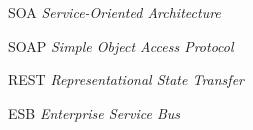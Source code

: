 \begin{siglas}
  \item[SOA] \textit{Service-Oriented Architecture}
  \item[SOAP] \textit{Simple Object Access Protocol}
  \item[REST] \textit{Representational State Transfer}
  \item[ESB] \textit{Enterprise Service Bus}
\end{siglas}
